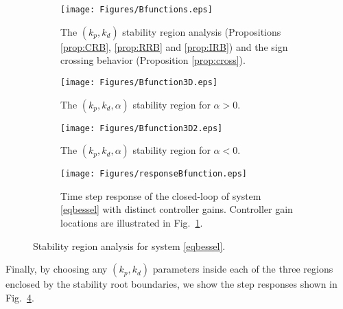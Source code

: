 \documentclass[twoside,reqno,11pt]{fcaa-var} %
\begin{document}
\begin{figure}[]
	\centering
	\begin{subfigure}[b]{0.48\columnwidth}
		\centering
		\texttt{[image: Figures/Bfunctions.eps]}
		\caption{The $(k_p,k_d)$ stability region analysis (Propositions \ref{prop:CRB}, \ref{prop:RRB} and \ref{prop:IRB}) and  the sign crossing behavior (Proposition \ref{prop:cross}).}
		\label{BesselRegiona}
	\end{subfigure}
	\hfill
	\begin{subfigure}[b]{0.48\columnwidth}
		\centering
		\texttt{[image: Figures/Bfunction3D.eps]}
		\caption{The $(k_p,k_d,\alpha)$ stability region for $\alpha>0$.}
		\label{BesselRegionb}
	\end{subfigure}
	\hfill
	\begin{subfigure}[b]{0.48\columnwidth}
		\centering
		\texttt{[image: Figures/Bfunction3D2.eps]}
		\caption{The $(k_p,k_d,\alpha)$ stability region for $\alpha<0$.}
		\label{BesselRegionc}
	\end{subfigure}
	\hfill
\begin{subfigure}[b]{0.48\columnwidth}
	\centering
	\texttt{[image: Figures/responseBfunction.eps]}
	\caption{Time step response of the closed-loop of system \eqref{eqbessel} with distinct controller gains. Controller gain locations are illustrated in Fig.~\ref{BesselRegiona}.}
	\label{BesselSresponses}
\end{subfigure}
	\caption{Stability region analysis for system \eqref{eqbessel}.}\label{BesselRegion}
\end{figure}
 Finally, by choosing any $(k_p,k_d)$ parameters inside each of the three regions enclosed by the stability root boundaries, we show the step responses shown in Fig.~\ref{BesselSresponses}. 
\end{document}
